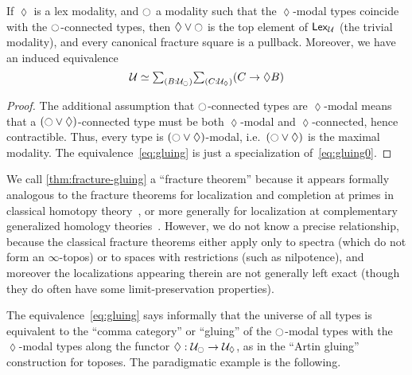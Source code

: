 \begin{cor}\label{thm:fracture-gluing}
  If $\lozenge$ is a lex modality, and ${\ocircle}$ a modality such that the $\lozenge$-modal types coincide with the ${\ocircle}$-connected types, then $\lozenge \lor {\ensuremath{\ocircle}}$ is the top element of $\mathsf{Lex}_{\mathcal{U}}$ (the trivial modality), and every canonical fracture square is a pullback.
  Moreover, we have an induced equivalence
  \begin{equation}
    \UU \simeq \sm{B:\UU_\modal}{C:\UU_\lozenge} (C \to \lozenge B)\label{eq:gluing}
  \end{equation}
\end{cor}
\begin{proof}
  The additional assumption that ${\ocircle}$-connected types are $\lozenge$-modal means that a $({\ocircle}\lor\lozenge)$-connected type must be both $\lozenge$-modal and $\lozenge$-connected, hence contractible.
  Thus, every type is $({\ocircle}\lor\lozenge)$-modal, i.e.\ $({\ocircle}\lor\lozenge)$ is the maximal modality.
  The equivalence~\eqref{eq:gluing} is just a specialization of~\eqref{eq:gluing0}.
\end{proof}

\begin{rmk}
  We call \cref{thm:fracture-gluing} a ``fracture theorem'' because it appears formally analogous to the fracture theorems for localization and completion at primes in classical homotopy theory~\cite{mp:more-concise}, or more generally for localization at complementary generalized homology theories~\cite{bauer:loc-hasse}.
  However, we do not know a precise relationship, because the classical fracture theorems either apply only to spectra (which do not form an $\infty$-topos) or to spaces with restrictions (such as nilpotence), and moreover the localizations appearing therein are not generally left exact (though they do often have some limit-preservation properties).
\end{rmk}

The equivalence~\eqref{eq:gluing} says informally that the universe of all types is equivalent to the ``comma category'' or ``gluing'' of the ${\ocircle}$-modal types with the $\lozenge$-modal types along the functor $\lozenge : \mathcal{U}_{\ocircle} \to \mathcal{U}_\lozenge$, as in the ``Artin gluing'' construction for toposes.
The paradigmatic example is the following.

